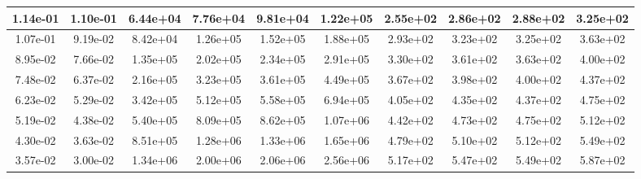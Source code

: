 \begin{large}\begin{tabular}{|c|c|c|c|c|c|c|c|c|c|}
\hline
1.14e-01&1.10e-01&6.44e+04&7.76e+04&9.81e+04&1.22e+05&2.55e+02&2.86e+02&2.88e+02&3.25e+02\\\hline
1.07e-01&9.19e-02&8.42e+04&1.26e+05&1.52e+05&1.88e+05&2.93e+02&3.23e+02&3.25e+02&3.63e+02\\\hline
8.95e-02&7.66e-02&1.35e+05&2.02e+05&2.34e+05&2.91e+05&3.30e+02&3.61e+02&3.63e+02&4.00e+02\\\hline
7.48e-02&6.37e-02&2.16e+05&3.23e+05&3.61e+05&4.49e+05&3.67e+02&3.98e+02&4.00e+02&4.37e+02\\\hline
6.23e-02&5.29e-02&3.42e+05&5.12e+05&5.58e+05&6.94e+05&4.05e+02&4.35e+02&4.37e+02&4.75e+02\\\hline
5.19e-02&4.38e-02&5.40e+05&8.09e+05&8.62e+05&1.07e+06&4.42e+02&4.73e+02&4.75e+02&5.12e+02\\\hline
4.30e-02&3.63e-02&8.51e+05&1.28e+06&1.33e+06&1.65e+06&4.79e+02&5.10e+02&5.12e+02&5.49e+02\\\hline
3.57e-02&3.00e-02&1.34e+06&2.00e+06&2.06e+06&2.56e+06&5.17e+02&5.47e+02&5.49e+02&5.87e+02\\\hline
\end{tabular}
\end{large}